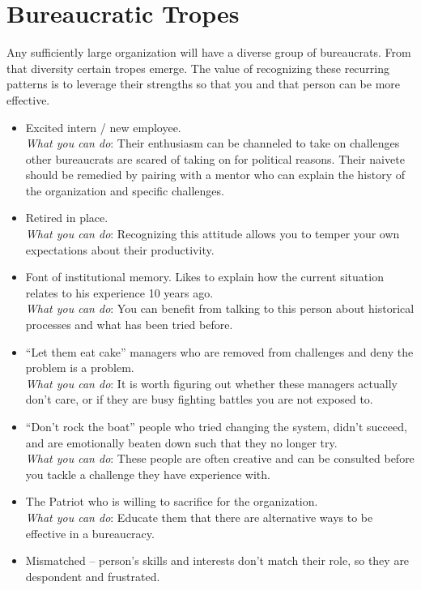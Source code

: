 \section{Bureaucratic Tropes\label{sec:tropes}}

Any sufficiently large organization will have a diverse group of bureaucrats. From that diversity certain tropes emerge. The value of recognizing these recurring patterns is to leverage their strengths so that you and that person can be more effective. 

\begin{itemize}
    \item Excited intern / new employee. \\
    \textit{What you can do}: Their enthusiasm can be channeled to take on challenges other bureaucrats are scared of taking on for political reasons. Their naivete should be remedied by pairing with a mentor who can explain the history of the organization and specific challenges.
    \item Retired in place. \\
    \textit{What you can do}: Recognizing this attitude allows you to temper your own expectations about their productivity. 
    \item Font of institutional memory. Likes to explain how the current situation relates to his experience 10 years ago. \\
    \textit{What you can do}: You can benefit from talking to this person about historical processes and what has been tried before. 
    \item ``Let them eat cake'' managers who are removed from challenges and deny the problem is a problem. \\
    \textit{What you can do}: It is worth figuring out whether these managers actually don't care, or if they are busy fighting battles you are not exposed to.
    \item ``Don't rock the boat'' people who tried changing the system, didn't succeed, and are emotionally beaten down such that they no longer try. \\
    \textit{What you can do}: These people are often creative and can be consulted before you tackle a challenge they have experience with. 
    \item The Patriot who is willing to sacrifice for the organization. \\
    \textit{What you can do}: Educate them that there are alternative ways to be effective in a bureaucracy.
    \item Mismatched -- person's skills and interests don't match their role, so they are despondent and frustrated. \\

\end{itemize}
